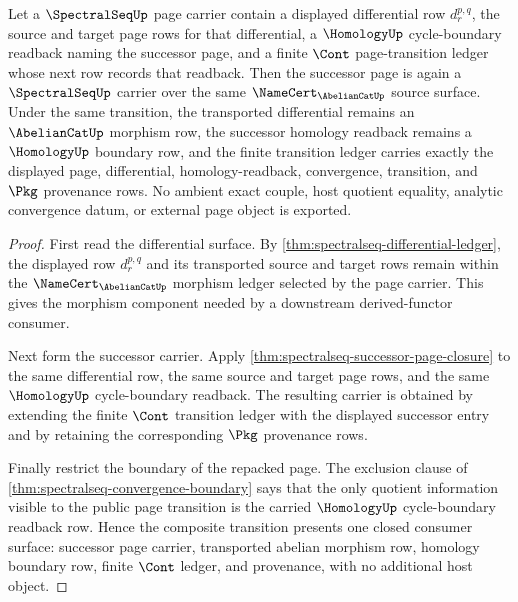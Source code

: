 \begin{theorem}
\label{thm:spectralseq-cont-page-transition-closure}
Let a $\SpectralSeqUp$ page carrier contain a displayed differential row
$d_r^{p,q}$, the source and target page rows for that differential, a
$\HomologyUp$ cycle-boundary readback naming the successor page, and a finite
$\Cont$ page-transition ledger whose next row records that readback. Then the
successor page is again a $\SpectralSeqUp$ carrier over the same
$\NameCert_{\AbelianCatUp}$ source surface. Under the same transition, the
transported differential remains an $\AbelianCatUp$ morphism row, the
successor homology readback remains a $\HomologyUp$ boundary row, and the
finite transition ledger carries exactly the displayed page, differential,
homology-readback, convergence, transition, and $\Pkg$ provenance rows.
No ambient exact couple, host quotient equality, analytic convergence datum,
or external page object is exported.
\end{theorem}
\begin{proof}
First read the differential surface. By
\autoref{thm:spectralseq-differential-ledger}, the displayed row
$d_r^{p,q}$ and its transported source and target rows remain within the
$\NameCert_{\AbelianCatUp}$ morphism ledger selected by the page carrier.
This gives the morphism component needed by a downstream derived-functor
consumer.

Next form the successor carrier. Apply
\autoref{thm:spectralseq-successor-page-closure} to the same differential
row, the same source and target page rows, and the same $\HomologyUp$
cycle-boundary readback. The resulting carrier is obtained by extending the
finite $\Cont$ transition ledger with the displayed successor entry and by
retaining the corresponding $\Pkg$ provenance rows.

Finally restrict the boundary of the repacked page. The exclusion clause of
\autoref{thm:spectralseq-convergence-boundary} says that the only quotient
information visible to the public page transition is the carried
$\HomologyUp$ cycle-boundary readback row. Hence the composite transition
presents one closed consumer surface: successor page carrier, transported
abelian morphism row, homology boundary row, finite $\Cont$ ledger, and
provenance, with no additional host object.
\end{proof}

